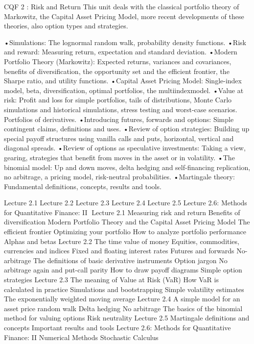 CQF 2 : Risk and Return 
This unit deals with the classical portfolio theory of Markowitz, the Capital Asset Pricing Model, more recent developments of these theories, also option types and strategies.
 
•Simulations: The lognormal random walk, probability density functions.
•Risk and reward: Measuring return, expectation and standard deviation.
•Modern Portfolio Theory (Markowitz): Expected returns, variances and covariances, benefits of diversification, the opportunity set and the efficient frontier, the Sharpe ratio, and utility functions.
•Capital Asset Pricing Model: Single-index model, beta, diversification, optimal portfolios, the multiindexmodel.
•Value at risk: Profit and loss for simple portfolios, tails of distributions, Monte Carlo simulations and historical simulations, stress testing and worst-case scenarios. Portfolios of derivatives.
•Introducing futures, forwards and options: Simple contingent claims, definitions and uses.
•Review of option strategies: Building up special payoff structures using vanilla calls and puts, horizontal, vertical and diagonal spreads.
•Review of options as speculative investments: Taking a view, gearing, strategies that benefit from moves in the asset or in volatility.
•The binomial model: Up and down moves, delta hedging and self-financing replication, no arbitrage, a pricing model, risk-neutral probabilities.
•Martingale theory: Fundamental definitions, concepts, results and tools.
 

Lecture 2.1
Lecture 2.2
Lecture 2.3
Lecture 2.4
Lecture 2.5
Lecture 2.6: Methods for Quantitative Finance: II
Lecture 2.1
Measuring risk and return
Benefits of diversification
Modern Portfolio Theory and the Capital Asset Pricing Model
The efficient frontier
Optimizing your portfolio
How to analyze portfolio performance
Alphas and betas
Lecture 2.2
The time value of money
Equities, commodities, currencies and indices
Fixed and floating interest rates
Futures and forwards
No-arbitrage
The definitions of basic derivative instruments
Option jargon
No arbitrage again and put-call parity
How to draw payoff diagrams
Simple option strategies
Lecture 2.3
The meaning of Value at Risk (VaR)
How VaR is calculated in practice
Simulations and bootstrapping
Simple volatility estimates
The exponentially weighted moving average
Lecture 2.4
A simple model for an asset price random walk
Delta hedging
No arbitrage
The basics of the binomial method for valuing options
Risk neutrality
Lecture 2.5
Martingale definitions and concepts
Important results and tools
Lecture 2.6: Methods for Quantitative Finance: II
Numerical Methods
Stochastic Calculus
